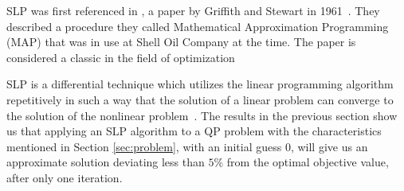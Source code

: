 SLP was first referenced in \cite{slp61}, a paper by Griffith and Stewart in
1961~\cite{boggs1985numerical}.
They described a procedure they called Mathematical Approximation Programming
(MAP) that was in use at Shell Oil Company at the time. The paper is considered
a classic in the field of optimization

SLP is a differential technique which utilizes the linear programming algorithm
repetitively in such a way that the solution of a linear problem can converge
to the solution of the nonlinear problem~\cite{slp61}.
The results in the previous section show
us that applying an SLP algorithm to a QP problem with the characteristics
mentioned in Section \ref{sec:problem}, with an initial guess 0, will give us
an approximate solution deviating less than $5\%$ from the optimal objective
value, after only one iteration.
